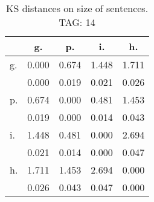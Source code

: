 \begin{table}[h!]
\begin{center}
\begin{tabular}{| l | c | c | c | c |}\hline
 & g. & p. & i. & h. \\\hline
g. & 0.000  & 0.674  & 1.448  & 1.711 \\\hline
 & 0.000  & 0.019  & 0.021  & 0.026 \\\hline
p. & 0.674  & 0.000  & 0.481  & 1.453 \\\hline
 & 0.019  & 0.000  & 0.014  & 0.043 \\\hline
i. & 1.448  & 0.481  & 0.000  & 2.694 \\\hline
 & 0.021  & 0.014  & 0.000  & 0.047 \\\hline
h. & 1.711  & 1.453  & 2.694  & 0.000 \\\hline
 & 0.026  & 0.043  & 0.047  & 0.000 \\\hline
\end{tabular}
\caption{KS distances on size of sentences. TAG: 14}
\end{center}
\end{table}
